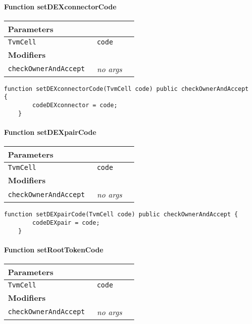 \paragraph{Function setDEXconnectorCode}


\ifsoltables
\noindent\begin{tabular}{|l|l|p{5cm}|}\hline
\multicolumn{3}{|l|}{\bf Parameters}\\\hline
\tt TvmCell & \tt code &\\\hline
\multicolumn{3}{|l|}{\bf Modifiers}\\\hline
\tt checkOwnerAndAccept & {\em no args} &\\\hline
\end{tabular}
\fi

\vspace{2cm}

\begin{lstlisting}[firstnumber=88]
	function setDEXconnectorCode(TvmCell code) public checkOwnerAndAccept {
		codeDEXconnector = code;
	}
\end{lstlisting}

\paragraph{Function setDEXpairCode}


\ifsoltables
\noindent\begin{tabular}{|l|l|p{5cm}|}\hline
\multicolumn{3}{|l|}{\bf Parameters}\\\hline
\tt TvmCell & \tt code &\\\hline
\multicolumn{3}{|l|}{\bf Modifiers}\\\hline
\tt checkOwnerAndAccept & {\em no args} &\\\hline
\end{tabular}
\fi

\vspace{2cm}

\begin{lstlisting}[firstnumber=84]
	function setDEXpairCode(TvmCell code) public checkOwnerAndAccept {
		codeDEXpair = code;
	}
\end{lstlisting}

\paragraph{Function setRootTokenCode}


\ifsoltables
\noindent\begin{tabular}{|l|l|p{5cm}|}\hline
\multicolumn{3}{|l|}{\bf Parameters}\\\hline
\tt TvmCell & \tt code &\\\hline
\multicolumn{3}{|l|}{\bf Modifiers}\\\hline
\tt checkOwnerAndAccept & {\em no args} &\\\hline
\end{tabular}
\fi

